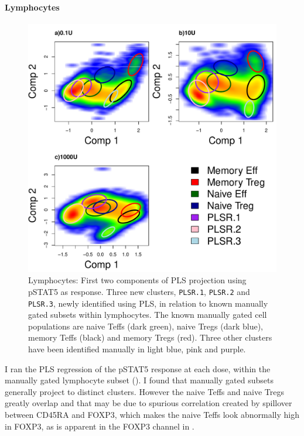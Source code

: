 \paragraph{Lymphocytes} 
\begin{figure}[!h]
\centering
\includegraphics[scale=.7]{figures/plsr-lymphocytes}
{ Lymphocytes: First two components of \gls{PLS} projection using pSTAT5 as response.}
{
Three new clusters, \texttt{PLSR.1}, \texttt{PLSR.2} and \texttt{PLSR.3}, newly identified using \gls{PLS}, in relation to known manually gated subsets within lymphocytes. 
The known manually gated cell populations are naive Teffs (dark green), naive Tregs (dark blue), memory Teffs (black) and memory Tregs (red).
Three other clusters have been identified manually in light blue, pink and purple.
} 
\end{figure}
I ran the PLS regression of the pSTAT5 response at each dose, within the manually gated lymphocyte subset ().
I found that manually gated subsets generally project to distinct clusters.
However the naive Teffs and naive Tregs greatly overlap and that may be due to spurious correlation created by
spillover between CD45RA and FOXP3, which makes the naive Teffs look abnormally high in FOXP3,
as is apparent in the FOXP3 channel in .
